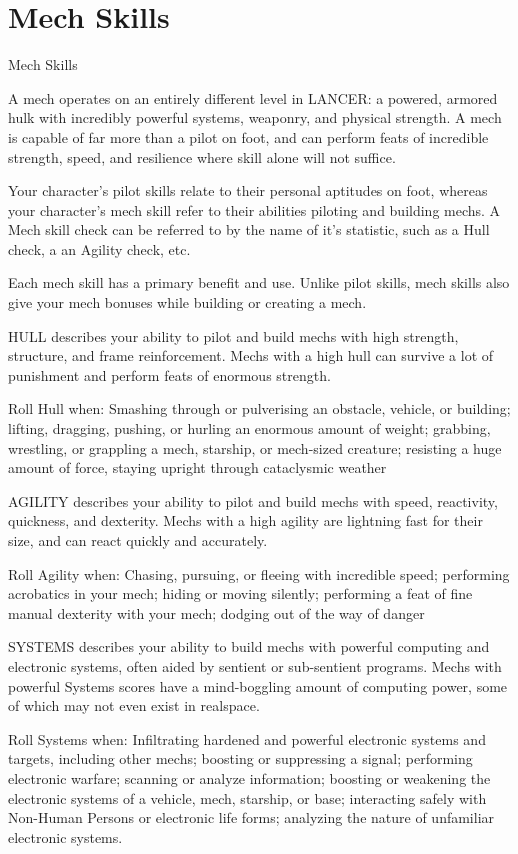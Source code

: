 \chapter{Mech Skills}
                                                  Mech Skills

A mech operates on an entirely different level in LANCER: a powered, armored hulk with
incredibly powerful systems, weaponry, and physical strength. A mech is capable of far more than
a pilot on foot, and can perform feats of incredible strength, speed, and resilience where skill
alone will not suffice.

Your character’s pilot skills relate to their personal aptitudes on foot, whereas your character’s
mech skill refer to their abilities piloting and building mechs. A Mech skill check can be referred to
by the name of it’s statistic, such as a Hull check, a an Agility check, etc.

Each mech skill has a primary benefit and use. Unlike pilot skills, mech skills also give your mech
bonuses while building or creating a mech.

HULL describes your ability to pilot and build mechs with high strength, structure, and frame
reinforcement. Mechs with a high hull can survive a lot of punishment and perform feats of
enormous strength.

Roll Hull when: Smashing through or pulverising an obstacle, vehicle, or building; lifting, dragging,
pushing, or hurling an enormous amount of weight; grabbing, wrestling, or grappling a mech,
starship, or mech-sized creature; resisting a huge amount of force, staying upright through
cataclysmic weather

AGILITY describes your ability to pilot and build mechs with speed, reactivity, quickness, and
dexterity. Mechs with a high agility are lightning fast for their size, and can react quickly and
accurately.

Roll Agility when: Chasing, pursuing, or fleeing with incredible speed; performing acrobatics in
your mech; hiding or moving silently; performing a feat of fine manual dexterity with your mech;
dodging out of the way of danger

SYSTEMS describes your ability to build mechs with powerful computing and electronic systems,
often aided by sentient or sub-sentient programs. Mechs with powerful Systems scores have a
mind-boggling amount of computing power, some of which may not even exist in realspace.

Roll Systems when: Infiltrating hardened and powerful electronic systems and targets, including
other mechs; boosting or suppressing a signal; performing electronic warfare; scanning or analyze
information; boosting or weakening the electronic systems of a vehicle, mech, starship, or base;
interacting safely with Non-Human Persons or electronic life forms; analyzing the nature of
unfamiliar electronic systems.




